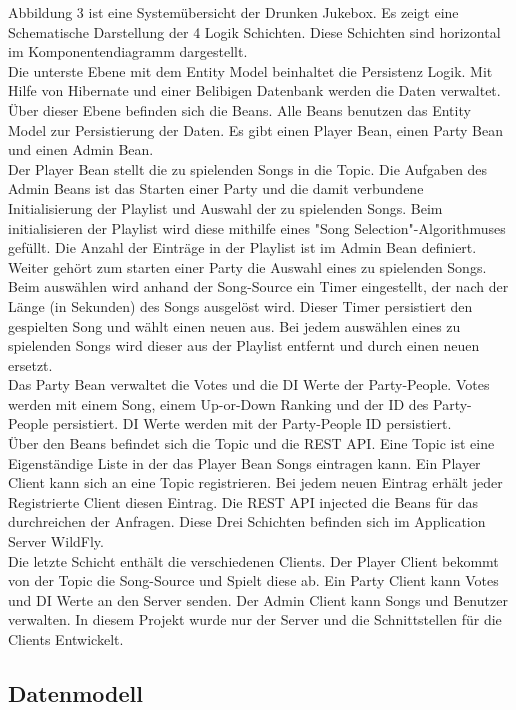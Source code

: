 Abbildung 3 ist eine Systemübersicht der Drunken Jukebox. Es zeigt eine Schematische Darstellung der 4 Logik Schichten. Diese Schichten sind horizontal im Komponentendiagramm dargestellt.\\ Die unterste Ebene mit dem Entity Model beinhaltet die Persistenz Logik. Mit Hilfe von Hibernate und einer Belibigen Datenbank werden die Daten verwaltet.\\
Über dieser Ebene befinden sich die Beans. Alle Beans benutzen das Entity Model zur Persistierung der Daten. Es gibt einen Player Bean, einen Party Bean und einen Admin Bean.\\
Der Player Bean stellt die zu spielenden Songs in die Topic. 
Die Aufgaben des Admin Beans ist das Starten einer Party und die damit verbundene Initialisierung der Playlist und Auswahl der zu spielenden Songs. Beim initialisieren der Playlist wird diese mithilfe eines "Song Selection"-Algorithmuses gefüllt. Die Anzahl der Einträge in der Playlist ist im Admin Bean definiert. Weiter gehört zum starten einer Party die Auswahl eines zu spielenden Songs. Beim auswählen wird anhand der Song-Source  ein Timer eingestellt, der nach der Länge (in Sekunden) des Songs ausgelöst wird. Dieser Timer persistiert den gespielten Song und wählt einen neuen aus. Bei jedem auswählen eines zu spielenden Songs wird dieser aus der Playlist entfernt und durch einen neuen ersetzt.\\
Das Party Bean verwaltet die Votes und die DI Werte der Party-People. Votes werden mit einem Song, einem Up-or-Down Ranking und der ID des Party-People persistiert. DI Werte werden mit der Party-People ID persistiert.\\
Über den Beans befindet sich die Topic und die REST API. Eine Topic ist eine Eigenständige Liste in der das Player Bean Songs eintragen kann. Ein Player Client kann sich an eine Topic registrieren. Bei jedem neuen Eintrag erhält jeder Registrierte Client diesen Eintrag. Die REST API injected die Beans für das durchreichen der Anfragen. Diese Drei Schichten befinden sich im Application Server WildFly.\\
Die letzte Schicht enthält die verschiedenen Clients. Der Player Client bekommt von der Topic die Song-Source und Spielt diese ab. Ein Party Client kann Votes und DI Werte an den Server senden. Der Admin Client kann Songs und Benutzer verwalten. In diesem Projekt wurde nur der Server und die Schnittstellen für die Clients Entwickelt.

 


\subsection{Datenmodell}

